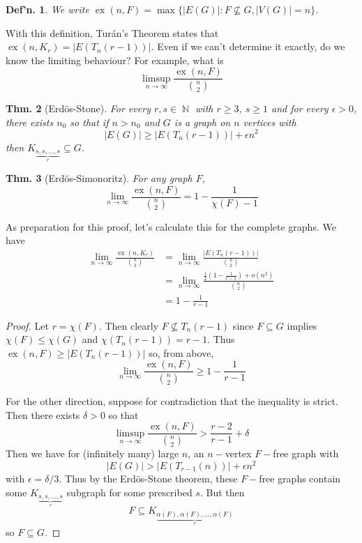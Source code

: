 \documentclass[12pt, a4paper]{book}
\DeclareMathOperator{\N}{\mathbb{N}}
\DeclareMathOperator{\ex}{ex}
\newtheorem{theorem}{Thm.}[section]
\newtheorem{definition}[theorem]{Def'n.}
\theoremstyle{nonumberplain}
\newtheorem{proof}{Proof}
\begin{document}
\begin{definition}
    We write $\ex(n,F)=\max\{|E(G)|:F\not\subseteq G,|V(G)|=n\}$.
\end{definition}
With this definition, Tur\'an's Theorem states that $\ex(n,K_r)=|E(T_n(r-1))|$.
Even if we can't determine it exactly, do we know the limiting behaviour?
For example, what is
\[\limsup_{n\to\infty}\frac{\ex(n,F)}{\binom{n}{2}}\]
\begin{theorem}[Erd\"os-Stone]
    For every $r,s\in\N$ with $r\geq 3$, $s\geq 1$ and for every $\epsilon>0$, there exists $n_0$ so that if $n>n_0$ and $G$ is a graph on $n$ vertices with
    \[|E(G)|\geq |E(T_n(r-1))|+\epsilon n^2\]
    then $K_{\underbrace{s,s,\ldots,s}_{r}}\subseteq G$.
\end{theorem}
\begin{theorem}[Erd\"os-Simonoritz]
    For any graph $F$,
    \[\lim_{n\to\infty}\frac{\ex(n,F)}{\binom{n}{2}}=1-\frac{1}{\chi(F)-1}\]
\end{theorem}
As preparation for this proof, let's calculate this for the complete graphs.
We have
\begin{align*}
    \lim_{n\to\infty}\frac{\ex(n,K_r)}{\binom{n}{2}} &= \lim_{n\to\infty}\frac{|E(T_n(r-1))|}{\binom{n}{2}}\\
                                                     &= \lim_{n\to\infty}\frac{\frac{1}{2}\left(1-\frac{1}{r-1}\right)+o(n^2)}{\binom{n}{2}}\\
                                                     &= 1-\frac{1}{r-1}
\end{align*}
\begin{proof}
    Let $r=\chi(F)$.
    Then clearly $F\not\subseteq T_n(r-1)$ since $F\subseteq G$ implies $\chi(F)\leq\chi(G)$ and $\chi(T_n(r-1))=r-1$.
    Thus $\ex(n,F)\geq |E(T_n(r-1))|$ so, from above,
    \begin{equation*}\lim_{n\to\infty}\frac{\ex(n,F)}{\binom{n}{2}}\geq 1-\frac{1}{r-1}\end{equation*}
    
    For the other direction, suppose for contradiction that the inequality is strict.
    Then there exists $\delta>0$ so that
    \begin{equation*}\limsup_{n\to\infty}\frac{\ex(n,F)}{\binom{n}{2}}>\frac{r-2}{r-1}+\delta\end{equation*}
    Then we have for (infinitely many) large $n$, an $n-$vertex $F-$free graph with
    \begin{equation*}|E(G)|>|E(T_{r-1}(n))|+\epsilon n^2\end{equation*}
    with $\epsilon=\delta/3$.
    Thus by the Erd\"os-Stone theorem, these $F-$free graphs contain some $K_{\underbrace{s,s,\ldots,s}_{r}}$ subgraph for some prescribed $s$.
    But then
    \[F\subseteq K_{\underbrace{\alpha(F),\alpha(F),\ldots,\alpha(F)}_{r}}\]
    so $F\subseteq G$.
\end{proof}
\end{document}
